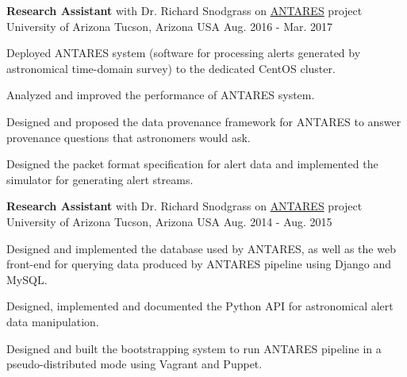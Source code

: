

\begin{cventries}

  \cventry
    {\textbf{Research Assistant} with Dr. Richard Snodgrass on \href{https://www.noao.edu/ANTARES/}{ANTARES} project} %
    {University of Arizona} %
    {Tucson, Arizona USA} %
    {Aug. 2016 - Mar. 2017} %
    {
      \begin{cvitems} %
        \item {Deployed ANTARES system (software for processing alerts
    generated by astronomical time-domain survey) to the dedicated
    CentOS cluster.} 
        \item {Analyzed and improved the performance of ANTARES system.}
        \item {Designed and proposed the data provenance framework for
    ANTARES to answer provenance questions that astronomers would ask.}
        \item {Designed the packet format specification for alert data
        and implemented the simulator for generating alert streams.}
      \end{cvitems}
    }

  \cventry
    {\textbf{Research Assistant} with Dr. Richard Snodgrass on \href{https://www.noao.edu/ANTARES/}{ANTARES} project} %
    {University of Arizona} %
    {Tucson, Arizona USA} %
    {Aug. 2014 - Aug. 2015} %
    {
      \begin{cvitems} %
        \item {Designed and implemented the database used by ANTARES,
    as well as the web front-end for querying data produced by ANTARES
    pipeline using Django and MySQL.} 
        \item {Designed, implemented and documented the Python API
    for astronomical alert data manipulation.}
        \item {Designed and built the bootstrapping
    system to run ANTARES pipeline in a pseudo-distributed mode
    using Vagrant and Puppet.}
      \end{cvitems}
    }


\end{cventries}
